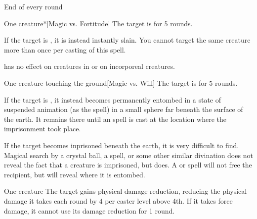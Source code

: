 \spellrng{\rngclose}
\spellline
\begin{spelltrigger}{End of every round}
    \begin{spelltarget}{One creature}*[Magic vs. Fortitude]
        \spellsuccess The target is \staggered for 5 rounds.

        If the target is \bloodied, it is instead instantly slain.
        \spellspecial You cannot target the same creature more than once per casting of this spell.
    \end{spelltarget}
\end{spelltrigger}
\spellnotes {} has no effect on creatures in  or on incorporeal creatures.

\spellrng{\rngclose}
\begin{spelltarget}{One creature touching the ground}[Magic vs. Will]
    \spellsuccess The target is \slowed for 5 rounds.

    \spellsuccess If the target is \bloodied, it instead becomes permanently entombed in a state of suspended animation (as the  spell) in a small sphere far beneath the surface of the earth. It remains there until an  spell is cast at the location where the imprisonment took place.
\end{spelltarget}

\spellnotes If the target becomes inprisoned beneath the earth, it is very difficult to find. Magical search by a crystal ball, a  spell, or some other similar divination does not reveal the fact that a creature is imprisoned, but  does. A  or  spell will not free the recipient, but will reveal where it is entombed.

\spellrng{\rngclose}
\spelldur{\durshort}
\begin{spelltarget}{One creature}
    \spelleffect The target gains physical damage reduction, reducing the physical damage it takes each round by 4  per caster level above 4th. If it takes force damage, it cannot use its damage reduction for 1 round.
\end{spelltarget}

